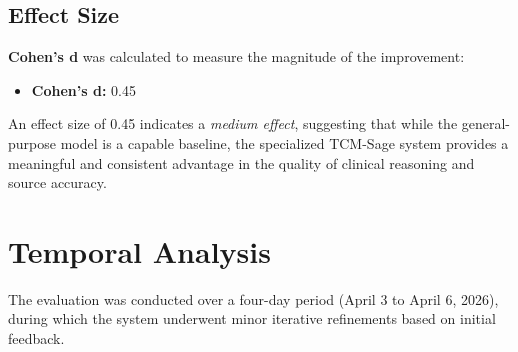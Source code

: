 \subsection{Effect Size}
\textbf{Cohen's d} was calculated to measure the magnitude of the improvement:
\begin{itemize}
    \item \textbf{Cohen's d:} 0.45
\end{itemize}
An effect size of 0.45 indicates a \textit{medium effect}, suggesting that while the general-purpose model is a capable baseline, the specialized TCM-Sage system provides a meaningful and consistent advantage in the quality of clinical reasoning and source accuracy.

\section{Temporal Analysis}

The evaluation was conducted over a four-day period (April 3 to April 6, 2026), during which the system underwent minor iterative refinements based on initial feedback.

